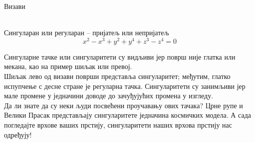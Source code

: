 \documentclass[sr]{./../../common/SurferDesc}%
\begin{document}
\footnotesize


\begin{surferPage}
  \begin{surferTitle}Визави\end{surferTitle} 
  \\
Сингуларан или регуларан – пријатељ или непријатељ\\
\smallskip
\[x^2	- x^3+ y^2+ y^4+ z^3- z^4	=  0\]

\vspace{0.3cm}
Сингуларне тачке или сингуларитети су видљиви јер површ није глатка или мекана, као на пример шиљак или превој.\\
\vspace{0.3cm}
Шиљак лево од визави површи представља сингуларитет; међутим, глатко испупчење с десне стране је регуларна тачка. Сингуларитети су занимљиви јер мале промене у једначини доводе до зачуђујућих промена у изгледу. \\

\vspace{0.3cm}
Да ли знате да су неки људи посвећени проучавању ових тачака? Црне рупе и Велики Прасак представљају сингуларитете једначина космичких модела. А сада погледајте врхове ваших прстију, сингуларитети наших врхова прстију нас одређују! 

  \begin{surferText}
     \end{surferText}
\end{surferPage}
\end{document}
